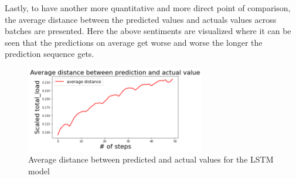 \documentclass[main.tex]{subfiles}
\begin{document}
Lastly, to have another more quantitative and more direct point of comparison, the average distance between the predicted values and actuals values across batches are presented. Here the above sentiments are visualized where it can be seen that the predictions on average get worse and worse the longer the prediction sequence gets.

\begin{figure}[H]
    \centering
    \includegraphics[width=0.7\textwidth]{RNNPlots/avgerrorlstm.png}
    \caption{Average distance between predicted and actual values for the LSTM model}
    \label{fig:avgerrorlstm}
\end{figure}
\end{document}

